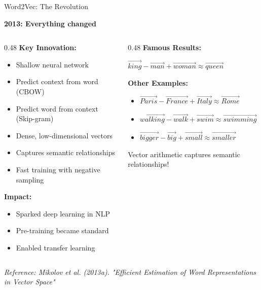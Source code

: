 \documentclass[aspectratio=169]{beamer}
\begin{document}
\begin{frame}[shrink=10]{Word2Vec: The Revolution 🚀}
\begin{center}
\LARGE
\textbf{2013: Everything changed}
\end{center}

\vspace{1em}

\begin{columns}[T]
\begin{column}{0.48\textwidth}
\textbf{Key Innovation:}
\begin{itemize}\setlength{\itemsep}{0pt}
    \item Shallow neural network
    \item Predict context from word (CBOW)
    \item Predict word from context (Skip-gram)
    \item Dense, low-dimensional vectors
    \item Captures semantic relationships
    \item \alert{Fast} training with negative sampling
\end{itemize}

\vspace{0.5em}
\textbf{Impact:}
\begin{itemize}\setlength{\itemsep}{0pt}
    \item Sparked deep learning in NLP
    \item Pre-training became standard
    \item Enabled transfer learning
\end{itemize}
\end{column}

\begin{column}{0.48\textwidth}
\textbf{Famous Results:}
\begin{center}
\Large
$\vec{king} - \vec{man} + \vec{woman} \approx \vec{queen}$
\end{center}

\vspace{1em}
\textbf{Other Examples:}
\begin{itemize}\setlength{\itemsep}{0pt}
    \item $\vec{Paris} - \vec{France} + \vec{Italy} \approx \vec{Rome}$
    \item $\vec{walking} - \vec{walk} + \vec{swim} \approx \vec{swimming}$
    \item $\vec{bigger} - \vec{big} + \vec{small} \approx \vec{smaller}$
\end{itemize}

\vspace{0.5em}
\alert{Vector arithmetic captures semantic relationships!}
\end{column}
\end{columns}

\vspace{0.5em}
\small
\textit{Reference: Mikolov et al. (2013a). "Efficient Estimation of Word Representations in Vector Space"}
\end{frame}
\end{document}
